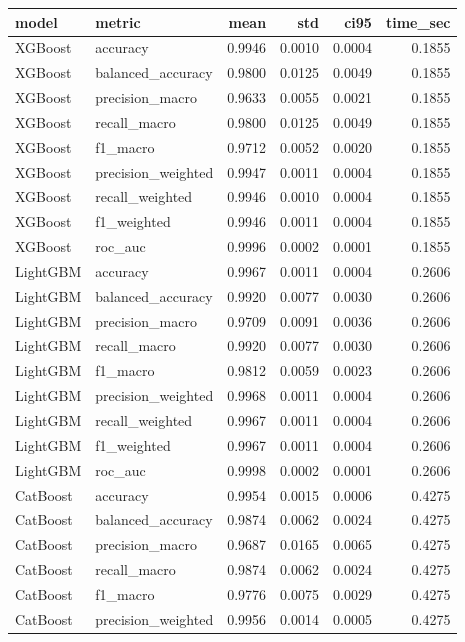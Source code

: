 \begin{tabular}{llrrrr}
\toprule
model & metric & mean & std & ci95 & time_sec \\
\midrule
XGBoost & accuracy & 0.9946 & 0.0010 & 0.0004 & 0.1855 \\
XGBoost & balanced_accuracy & 0.9800 & 0.0125 & 0.0049 & 0.1855 \\
XGBoost & precision_macro & 0.9633 & 0.0055 & 0.0021 & 0.1855 \\
XGBoost & recall_macro & 0.9800 & 0.0125 & 0.0049 & 0.1855 \\
XGBoost & f1_macro & 0.9712 & 0.0052 & 0.0020 & 0.1855 \\
XGBoost & precision_weighted & 0.9947 & 0.0011 & 0.0004 & 0.1855 \\
XGBoost & recall_weighted & 0.9946 & 0.0010 & 0.0004 & 0.1855 \\
XGBoost & f1_weighted & 0.9946 & 0.0011 & 0.0004 & 0.1855 \\
XGBoost & roc_auc & 0.9996 & 0.0002 & 0.0001 & 0.1855 \\
LightGBM & accuracy & 0.9967 & 0.0011 & 0.0004 & 0.2606 \\
LightGBM & balanced_accuracy & 0.9920 & 0.0077 & 0.0030 & 0.2606 \\
LightGBM & precision_macro & 0.9709 & 0.0091 & 0.0036 & 0.2606 \\
LightGBM & recall_macro & 0.9920 & 0.0077 & 0.0030 & 0.2606 \\
LightGBM & f1_macro & 0.9812 & 0.0059 & 0.0023 & 0.2606 \\
LightGBM & precision_weighted & 0.9968 & 0.0011 & 0.0004 & 0.2606 \\
LightGBM & recall_weighted & 0.9967 & 0.0011 & 0.0004 & 0.2606 \\
LightGBM & f1_weighted & 0.9967 & 0.0011 & 0.0004 & 0.2606 \\
LightGBM & roc_auc & 0.9998 & 0.0002 & 0.0001 & 0.2606 \\
CatBoost & accuracy & 0.9954 & 0.0015 & 0.0006 & 0.4275 \\
CatBoost & balanced_accuracy & 0.9874 & 0.0062 & 0.0024 & 0.4275 \\
CatBoost & precision_macro & 0.9687 & 0.0165 & 0.0065 & 0.4275 \\
CatBoost & recall_macro & 0.9874 & 0.0062 & 0.0024 & 0.4275 \\
CatBoost & f1_macro & 0.9776 & 0.0075 & 0.0029 & 0.4275 \\
CatBoost & precision_weighted & 0.9956 & 0.0014 & 0.0005 & 0.4275 \\

\end{tabular}
